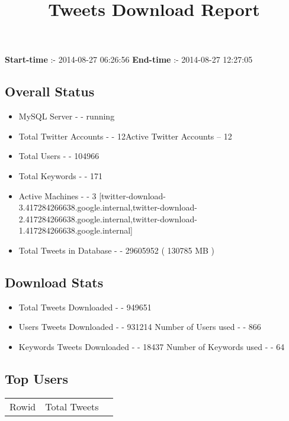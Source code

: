 \documentclass{article}\usepackage[T1]{fontenc}
\begin{document}
\title{\textbf{Tweets Download Report}}
               \date{}
                \maketitle
               \centerline{\textbf{Start-time} :- 2014-08-27 06:26:56 \hspace{40pt} \textbf{End-time} :- 2014-08-27 12:27:05}               \subsection*{Overall Status}                \begin{itemize}                \item MySQL Server - - running               \item Total Twitter Accounts - - 12\newline Active Twitter Accounts -- 12               \item Total Users - - 104966               \item Total Keywords - - 171               \item Active Machines - - 3 [twitter-download-3.417284266638.google.internal,twitter-download-2.417284266638.google.internal,twitter-download-1.417284266638.google.internal]               \item Total Tweets in Database - - 29605952 ( 130785 MB )               \end{itemize}               \subsection*{Download Stats}                \begin{itemize}                \item Total Tweets Downloaded - - 949651               \item Users Tweets Downloaded - - 931214 \newline Number of Users used - - 866               \item Keywords Tweets Downloaded - - 18437 \newline Number of Keywords used - - 64              \end{itemize}              \subsection*{Top Users}\begin{tabular}{|c|c|c|}         \hline         Rowid & Total Tweets \\ 

\end{tabular}
\end{document}
